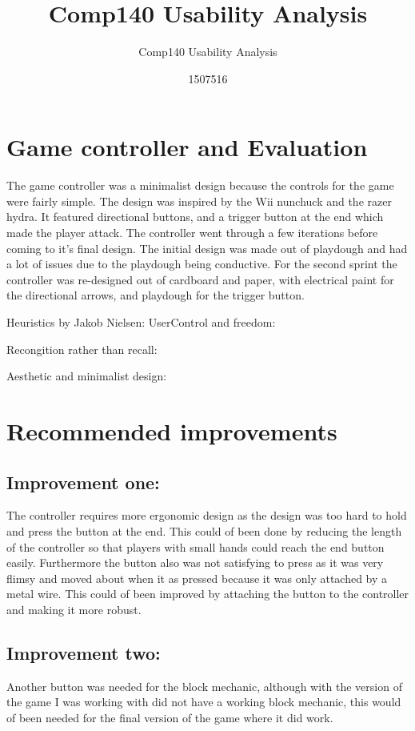 \documentclass{scrartcl}
\title{Comp140 Usability Analysis}
\subtitle{Comp140 Usability Analysis}
\author{1507516}
\begin{document}
\maketitle

\abstract{}

\section{Game controller and Evaluation}

The game controller was a minimalist design because the controls for the game were fairly simple. The design was inspired by the Wii nunchuck and the razer hydra. It featured directional buttons, and a trigger button at the end which made the player attack. The controller went through a few iterations before coming to it's final design. The initial design was made out of playdough and had a lot of issues due to the playdough being conductive. For the second sprint the controller was re-designed out of cardboard and paper, with electrical paint for the directional arrows, and playdough for the trigger button.

Heuristics by Jakob Nielsen\cite{nielsen1990heuristic}:
UserControl and freedom:

Recongition rather than recall:


Aesthetic and minimalist design:




\section{Recommended improvements}

\subsection{Improvement one:}
The controller requires more ergonomic design as the design was too hard to hold and press the button at the end. This could of been done by reducing the length of the controller so that players with small hands could reach the end button easily. Furthermore the button also was not satisfying to press as it was very flimsy and moved about when it as pressed because it was only attached by a metal wire. This could of been improved by attaching the button to the controller and making it more robust.

\subsection{Improvement two:}
Another button was needed for the block mechanic, although with the version of the game I was working with did not have a working block mechanic, this would of been needed for the final version of the game where it did work.
\end{document}
